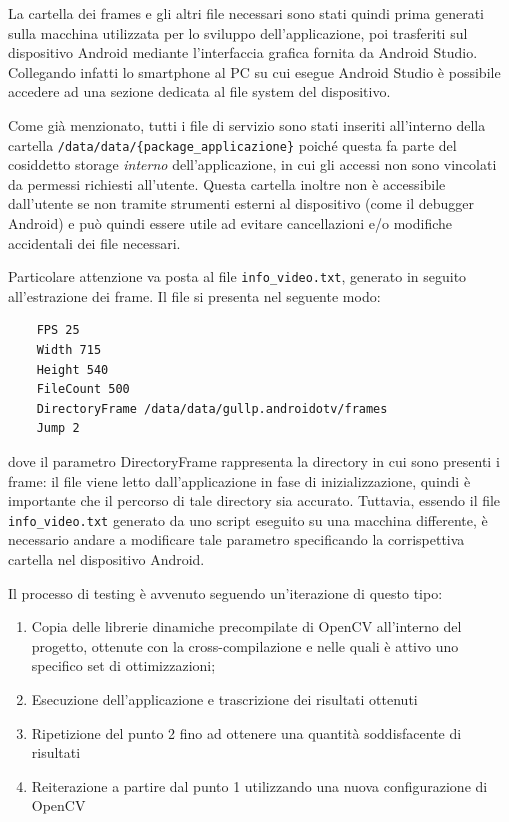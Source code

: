 La cartella dei frames e gli altri file necessari sono stati quindi prima generati sulla macchina utilizzata per lo sviluppo
dell'applicazione, poi trasferiti sul dispositivo Android mediante l'interfaccia grafica fornita da Android Studio.
Collegando infatti lo smartphone al PC su cui esegue Android Studio è possibile accedere ad una sezione dedicata al file system
del dispositivo.

Come già menzionato, tutti i file di servizio sono stati inseriti all'interno della cartella \texttt{/data/data/\{package\_applicazione\}}
poiché questa fa parte del cosiddetto storage \emph{interno} dell'applicazione, in cui gli accessi non sono vincolati da permessi
richiesti all'utente. Questa cartella inoltre non è accessibile dall'utente se non tramite strumenti esterni al dispositivo 
(come il debugger Android) e può quindi essere utile ad evitare cancellazioni e/o modifiche accidentali dei file necessari.

Particolare attenzione va posta al file \texttt{info\_video.txt}, generato in seguito all'estrazione dei frame. Il file si
presenta nel seguente modo:

\begin{verbatim}
    FPS 25
    Width 715
    Height 540
    FileCount 500
    DirectoryFrame /data/data/gullp.androidotv/frames
    Jump 2
\end{verbatim}

dove il parametro DirectoryFrame rappresenta la directory in cui sono presenti i frame: il file viene letto dall'applicazione
in fase di inizializzazione, quindi è importante che il percorso di tale directory sia accurato.
Tuttavia, essendo il file \texttt{info\_video.txt} generato da uno script eseguito su una macchina differente, è necessario
andare a modificare tale parametro specificando la corrispettiva cartella nel dispositivo Android.

\vspace{1em}

Il processo di testing è avvenuto seguendo un'iterazione di questo tipo:

\begin{enumerate}
    \item Copia delle librerie dinamiche precompilate di OpenCV all'interno del progetto, ottenute con la cross-compilazione 
    e nelle quali è attivo uno specifico set di ottimizzazioni;
    \item Esecuzione dell'applicazione e trascrizione dei risultati ottenuti
    \item Ripetizione del punto 2 fino ad ottenere una quantità soddisfacente di risultati
    \item Reiterazione a partire dal punto 1 utilizzando una nuova configurazione di OpenCV
\end{enumerate}

